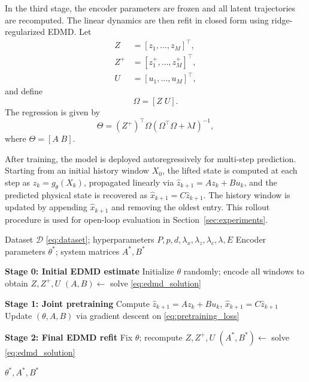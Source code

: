 \documentclass[journal]{IEEEtran}
\begin{document}
In the third stage, the encoder parameters are frozen and all latent trajectories are recomputed. The linear dynamics are then refit in closed form using ridge-regularized EDMD. Let
\begin{align}
    Z &= [z_1,\ldots,z_M]^\top, \\
    Z^{+} &= [z_1^{+},\ldots,z_M^{+}]^\top, \\
    U &= [u_1,\ldots,u_M]^\top,
\end{align}
and define
\begin{equation}
    \Omega = [Z\;U].
\end{equation}
The regression is given by
\begin{equation}
    \Theta = (Z^{+})^\top \Omega \left(\Omega^\top \Omega + \lambda I\right)^{-1},
    \label{eq:edmd_solution}
\end{equation}
where $\Theta = [A\;B]$.

After training, the model is deployed autoregressively for multi-step prediction. Starting from an initial history window $X_0$, the lifted state is computed at each step as $z_k = g_\theta(X_k)$, propagated linearly via $\hat{z}_{k+1} = A z_k + B u_k$, and the predicted physical state is recovered as $\hat{x}_{k+1} = C\hat{z}_{k+1}$. The history window is updated by appending $\hat{x}_{k+1}$ and removing the oldest entry. This rollout procedure is used for open-loop evaluation in Section~\ref{sec:experiments}.

\begin{algorithm}[!t]
\caption{Transformer-Koopman Training Pipeline}
\label{alg:training}
\begin{algorithmic}[1]
\REQUIRE Dataset $\mathcal{D}$ \eqref{eq:dataset}; hyperparameters $P,p,d,\lambda_x,\lambda_z,\lambda_c,\lambda,E$
\ENSURE Encoder parameters $\theta^{*}$; system matrices $A^{*},B^{*}$

\STATE \textbf{Stage 0: Initial EDMD estimate}
\STATE Initialize $\theta$ randomly; encode all windows to obtain $Z,Z^{+},U$
\STATE $(A,B)\leftarrow$ solve \eqref{eq:edmd_solution}

\STATE \textbf{Stage 1: Joint pretraining}
        \STATE Compute $\hat{z}_{k+1}=Az_k+Bu_k$, $\hat{x}_{k+1}=C\hat{z}_{k+1}$
        \STATE Update $(\theta,A,B)$ via gradient descent on \eqref{eq:pretraining_loss}
    \ENDFOR
\ENDFOR

\STATE \textbf{Stage 2: Final EDMD refit}
\STATE Fix $\theta$; recompute $Z,Z^{+},U$
\STATE $(A^{*},B^{*})\leftarrow$ solve \eqref{eq:edmd_solution}

\RETURN $\theta^{*}, A^{*}, B^{*}$
\end{algorithmic}
\end{algorithm}
\end{document}
